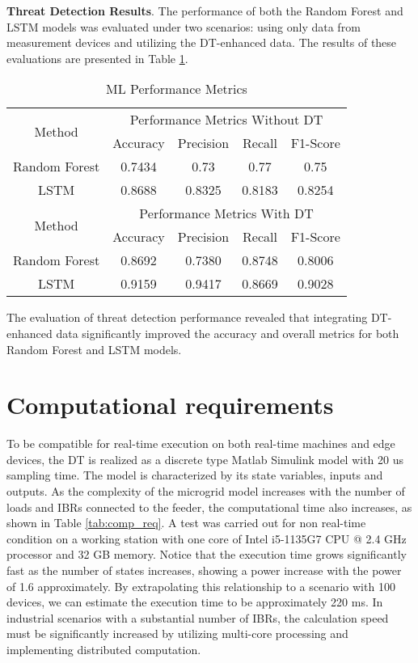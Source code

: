 \textbf{Threat Detection Results}. The performance of both the Random Forest and LSTM models was evaluated under two scenarios: using only data from measurement devices and utilizing the DT-enhanced data. The results of these evaluations are presented in Table \ref{tab:performance_metrics}.

\begin{table}[h]
    \centering
    \caption{ML Performance Metrics}
    \begin{tabular}{|c|c|c|c|c|}
        \hline
        \multirow{2}{*}{Method} & \multicolumn{4}{c|}{Performance Metrics Without DT} \\ \cline{2-5}
         & Accuracy & Precision & Recall & F1-Score \\ \hline
        Random Forest & 0.7434 & 0.73 & 0.77 & 0.75 \\ \hline
        LSTM & 0.8688 & 0.8325 & 0.8183 & 0.8254 \\ \hline
        \multirow{2}{*}{Method} & \multicolumn{4}{c|}{Performance Metrics With DT} \\ \cline{2-5}
         & Accuracy & Precision & Recall & F1-Score \\ \hline
        Random Forest & 0.8692 & 0.7380 & 0.8748 & 0.8006 \\ \hline
        LSTM & 0.9159 & 0.9417 & 0.8669 & 0.9028 \\ \hline
    \end{tabular}
    
    \label{tab:performance_metrics}
\end{table}

The evaluation of threat detection performance revealed that integrating DT-enhanced data significantly improved the accuracy and overall metrics for both Random Forest and LSTM models.

\section{Computational requirements}\label{sec:ch4/sec6}

To be compatible for real-time execution on both real-time machines and edge devices, the DT is realized as a discrete type Matlab Simulink model with 20 us sampling time. The model is characterized by its state variables, inputs and outputs. As the complexity of the microgrid model increases with the number of loads and IBRs connected to the feeder, the computational time also increases, as shown in Table \ref{tab:comp_req}. A test was carried out for non real-time condition on a working station with one core of Intel i5-1135G7 CPU @ 2.4 GHz processor and 32 GB memory. Notice that the execution time grows significantly fast as the number of states increases, showing a power increase with the power of 1.6 approximately. By extrapolating this relationship to a scenario with 100 devices, we can estimate the execution time to be approximately 220 ms. In industrial scenarios with a substantial number of IBRs, the calculation speed must be significantly increased by utilizing multi-core processing and implementing distributed computation.

